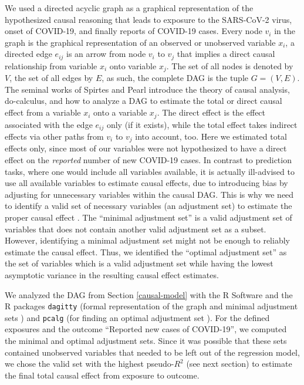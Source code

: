 \documentclass[]{elsarticle} %
\begin{document}
We used a directed acyclic graph as a graphical representation of the hypothesized causal reasoning that leads to exposure to the SARS-CoV-2 virus, onset of COVID-19, and finally reports of COVID-19 cases. Every node \(v_i\) in the graph is the graphical representation of an observed or unobserved variable \(x_i\), a directed edge \(e_{ij}\) is an arrow from node \(v_i\) to \(v_j\) that implies a direct causal relationship from variable \(x_i\) onto variable \(x_j\). The set of all nodes is denoted by \(V\), the set of all edges by \(E\), as such, the complete DAG is the tuple \(G=(V,E)\). The seminal works of Spirtes and Pearl \citep{spirtes2000causation, pearl2009causality} introduce the theory of causal analysis, do-calculus, and how to analyze a DAG to estimate the total or direct causal effect from a variable \(x_i\) onto a variable \(x_j\). The direct effect is the effect associated with the edge \(e_{ij}\) only (if it exists), while the total effect takes indirect effects via other paths from \(v_i\) to \(v_j\) into account, too. Here we estimated total effects only, since most of our variables were not hypothesized to have a direct effect on the \emph{reported} number of new COVID-19 cases. In contrast to prediction tasks, where one would include all variables available, it is actually ill-advised to use all available variables to estimate causal effects, due to introducing bias by adjusting for unnecessary variables within the causal DAG. This is why we need to identify a valid set of necessary variables (an adjustment set) to estimate the proper causal effect \citep{pearl2009causality}. The ``minimal adjustment set'' \citep{greenland1999causal} is a valid adjustment set of variables that does not contain another valid adjustment set as a subset. However, identifying a minimal adjustment set might not be enough to reliably estimate the causal effect. Thus, we identified the ``optimal adjustment set'' \citep{henckel2019graphical} as the set of variables which is a valid adjustment set while having the lowest asymptotic variance in the resulting causal effect estimates.

We analyzed the DAG from Section \ref{causal-model} with the R Software \citep{rsoftware} and the R packages \texttt{dagitty} (formal representation of the graph and minimal adjustment sets \citep{textor_robust_2017}) and \texttt{pcalg} (for finding an optimal adjustment set \citep{pcalg}). For the defined exposures and the outcome ``Reported new cases of COVID-19'', we computed the minimal and optimal adjustment sets. Since it was possible that these sets contained unobserved variables that needed to be left out of the regression model, we chose the valid set with the highest pseudo-\(R^2\) (see next section) to estimate the final total causal effect from exposure to outcome.
\end{document}
